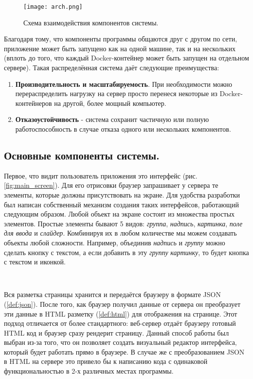 \begin{figure}[h]
    \centering
    \texttt{[image: arch.png]}
    \caption{Схема взаимодействия компонентов системы.}
    \label{fig:arch}
\end{figure}

\noindent Благодаря тому, что компоненты программы общаются друг с другом по сети, приложение может быть запущено как
на одной машине, так и на нескольких (вплоть до того, что каждый Docker-контейнер может быть запущен на отдельном сервере).
Такая распределённая система даёт следующие преимущества:
\begin{enumerate}
    \item \textbf{Производительность и масштабируемость}. При необходимости можно перераспределить нагрузку на сервер
    просто перенеся некоторые из Docker-контейнеров на другой, более мощный компьютер.
    \item \textbf{Отказоустойчивость} - система сохранит частичную или полную работоспособность в случае отказа одного
    или нескольких компонентов.
\end{enumerate}

\subsection{Основные компоненты системы.}

Первое, что видит пользователь приложения это интерфейс (рис. \ref{fig:main_screen}). Для его отрисовки браузер запрашивает
у сервера те элементы, которые должны присутствовать на экране. Для удобства разработки был написан собственный механизм
создания таких интерфейсов, работающий следующим образом. Любой объект на экране состоит из множества простых элементов.
Простые элементы бывают 5 видов: \textit{группа}, \textit{надпись}, \textit{картинка}, \textit{поле для ввода} и
\textit{слайдер}. Комбинируя их в любом количестве мы можем создавать объекты любой сложности. Например, объединив
\textit{надпись} и \textit{группу} можно сделать кнопку с текстом, а если добавить в эту \textit{группу} \textit{картинку},
то будет кнопка с текстом и иконкой.

~\

\noindent Вся разметка страницы хранится и передаётся браузеру в формате JSON (\ref{def:json}). После того, как браузер
получил данные от сервера он преобразует эти данные в HTML разметку (\ref{def:html}) для отображения на странице. Этот подход
отличается от более стандартного: веб-сервер отдаёт браузеру готовый HTML код и браузер сразу рендерит страницу.
Данный способ работы был выбран из-за того, что он позволяет создать визуальный редактор интерфейса, который будет работать
прямо в браузере. В случае же с преобразованием JSON в HTML на сервере это привело бы к написанию кода с одинаковой
функциональностью в 2-х различных местах программы.

